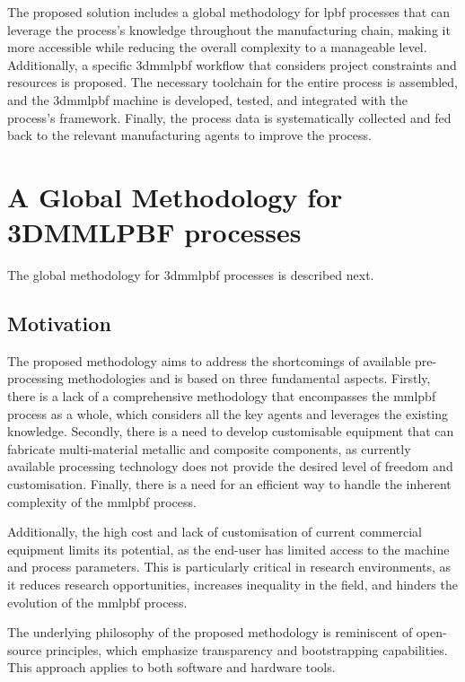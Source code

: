 The proposed solution includes a global methodology for \gls{lpbf} processes
that can leverage the process's knowledge throughout the manufacturing chain,
making it more accessible while reducing the overall complexity to a manageable
level. Additionally, a specific \gls{3dmmlpbf} workflow that considers project
constraints and resources is proposed. The necessary toolchain for the entire
process is assembled, and the \gls{3dmmlpbf} machine is developed, tested, and
integrated with the process's framework. Finally, the process data is systematically collected and fed back to the relevant manufacturing agents to improve the process.

%
\section{A Global Methodology for 3DMMLPBF processes}
The global methodology for \gls{3dmmlpbf} processes is described next.

\subsection{Motivation}
The proposed methodology aims to address the shortcomings of available pre-processing methodologies and is based on three fundamental aspects. Firstly, there is a lack of a comprehensive methodology that encompasses the \gls{mmlpbf} process as a whole, which considers all the key agents and leverages the existing knowledge. Secondly, there is a need to develop customisable equipment that can fabricate multi-material metallic and composite components, as currently available processing technology does not provide the desired level of freedom and customisation. Finally, there is a need for an efficient way to handle the inherent complexity of the \gls{mmlpbf} process.

Additionally, the high cost and lack of customisation of current commercial equipment limits its potential, as the end-user has limited access to the machine and process parameters. This is particularly critical in research environments, as it reduces research opportunities, increases inequality in the field, and hinders the evolution of the \gls{mmlpbf} process.

The underlying philosophy of the proposed methodology is reminiscent of
open-source principles, which emphasize transparency and bootstrapping
capabilities. This approach applies to both software and hardware tools.

